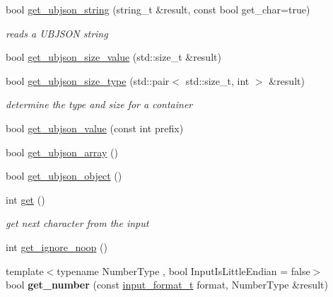 \begin{DoxyCompactItemize}
\item 
bool \mbox{\hyperlink{classnlohmann_1_1detail_1_1binary__reader_a2e01eab458020d18c975e8df55b20eca}{get\+\_\+ubjson\+\_\+string}} (string\+\_\+t \&result, const bool get\+\_\+char=true)
\begin{DoxyCompactList}\small\item\em reads a U\+B\+J\+S\+ON string \end{DoxyCompactList}\item 
bool \mbox{\hyperlink{classnlohmann_1_1detail_1_1binary__reader_a435be58e83c8491556d8f1a1b3439155}{get\+\_\+ubjson\+\_\+size\+\_\+value}} (std\+::size\+\_\+t \&result)
\item 
bool \mbox{\hyperlink{classnlohmann_1_1detail_1_1binary__reader_a4eae4604064b5dfe6d04e42ffc9e0753}{get\+\_\+ubjson\+\_\+size\+\_\+type}} (std\+::pair$<$ std\+::size\+\_\+t, int $>$ \&result)
\begin{DoxyCompactList}\small\item\em determine the type and size for a container \end{DoxyCompactList}\item 
bool \mbox{\hyperlink{classnlohmann_1_1detail_1_1binary__reader_a5f425199a77f403e32f076ff8487f853}{get\+\_\+ubjson\+\_\+value}} (const int prefix)
\item 
bool \mbox{\hyperlink{classnlohmann_1_1detail_1_1binary__reader_a4e8ef9561d4403ea68e3c2712fd289e2}{get\+\_\+ubjson\+\_\+array}} ()
\item 
bool \mbox{\hyperlink{classnlohmann_1_1detail_1_1binary__reader_ad0932dd568fcbbd2b4c2ccf9122544a5}{get\+\_\+ubjson\+\_\+object}} ()
\item 
int \mbox{\hyperlink{classnlohmann_1_1detail_1_1binary__reader_af70e7d5f19a2ee196e24f58acf579411}{get}} ()
\begin{DoxyCompactList}\small\item\em get next character from the input \end{DoxyCompactList}\item 
int \mbox{\hyperlink{classnlohmann_1_1detail_1_1binary__reader_a11a145292c1cc44656c34a6aef38759c}{get\+\_\+ignore\+\_\+noop}} ()
\item 
\mbox{\label{classnlohmann_1_1detail_1_1binary__reader_a161cda5919ea2436b7999c2a76656aba}} 
{\footnotesize template$<$typename Number\+Type , bool Input\+Is\+Little\+Endian = false$>$ }\\bool {\bfseries get\+\_\+number} (const \mbox{\hyperlink{namespacenlohmann_1_1detail_aa554fc6a11519e4f347deb25a9f0db40}{input\+\_\+format\+\_\+t}} format, Number\+Type \&result)

\end{DoxyCompactItemize}

